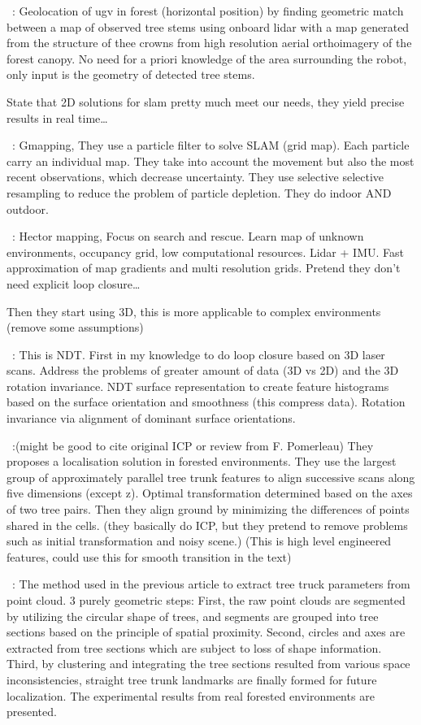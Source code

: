 ~\cite{Hussein2015}:
Geolocation of ugv in forest (horizontal position) by finding geometric match between a map of observed tree stems using onboard lidar with a map generated from the structure of thee crowns from high resolution aerial orthoimagery of the forest canopy. No need for a priori knowledge of the area surrounding the robot, only input is the geometry of detected tree stems.

State that 2D solutions for slam pretty much meet our needs, they yield precise results in real time\dots

~\cite{Grisetti2007}: Gmapping,
They use a particle filter to solve SLAM (grid map). Each particle carry an individual map. They take into account the movement but also the most recent observations, which decrease uncertainty. They use selective selective resampling to reduce the problem of particle depletion. They do indoor AND outdoor. 

~\cite{Kohlbrecher2011}: Hector mapping,
Focus on search and rescue. Learn map of unknown environments, occupancy grid, low computational resources. Lidar + IMU. Fast approximation of map gradients and multi resolution grids. Pretend they don't need explicit loop closure\dots


Then they start using 3D, this is more applicable to complex environments (remove some assumptions)

~\cite{Magnusson2009}:
This is NDT. First in my knowledge to do loop closure based on 3D laser scans. Address the problems of greater amount of data (3D vs 2D) and the 3D rotation invariance. NDT surface representation to create feature histograms based on the surface orientation and smoothness (this compress data). Rotation invariance via alignment of dominant surface orientations.

~\cite{Song2012}:(might be good to cite original ICP or review from F. Pomerleau)
They proposes a localisation solution in forested environments. They use the largest group of approximately parallel tree trunk features to align successive scans along five dimensions (except z). Optimal transformation determined based on the axes of two tree pairs. Then they align ground by minimizing the differences of points shared in the cells. (they basically do ICP, but they pretend to remove problems such as initial transformation and noisy scene.) (This is high level engineered features, could use this for smooth transition in the text)

~\cite{Iagnemma2012}:
The method used in the previous article to extract tree truck parameters from point cloud. 3 purely geometric steps: First, the raw point clouds are segmented by utilizing the circular shape of trees, and segments are grouped into tree sections based on the principle of spatial proximity. Second, circles and axes are extracted from tree sections which are subject to loss of shape information. Third, by clustering and integrating the tree sections resulted from various space inconsistencies, straight tree trunk landmarks are finally formed for future localization. The experimental results from real forested environments are presented.

